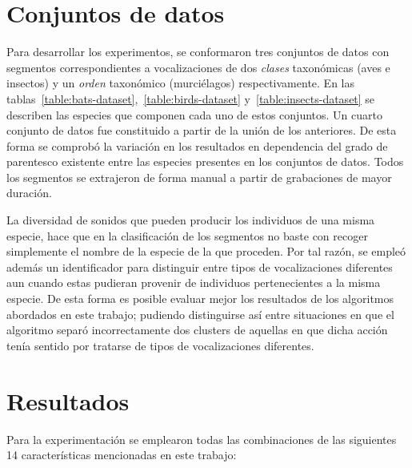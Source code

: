 \section{Conjuntos de datos}\label{sec:datasets}

Para desarrollar los experimentos, se conformaron tres conjuntos de datos con segmentos correspondientes a vocalizaciones de dos \textit{clases} taxonómicas (aves e insectos) y un \textit{orden} taxonómico (murciélagos) respectivamente.
En las tablas~\ref{table:bats-dataset},~\ref{table:birds-dataset} y~\ref{table:insects-dataset} se describen las especies que componen cada uno de estos conjuntos.
Un cuarto conjunto de datos fue constituido a partir de la unión de los anteriores.
De esta forma se comprobó la variación en los resultados en dependencia del grado de parentesco existente entre las especies presentes en los conjuntos de datos.
Todos los segmentos se extrajeron de forma manual a partir de grabaciones de mayor duración.

La diversidad de sonidos que pueden producir los individuos de una misma especie, hace que en la clasificación de los segmentos no baste con recoger simplemente el nombre de la especie de la que proceden.
Por tal razón, se empleó además un identificador para distinguir entre tipos de vocalizaciones diferentes aun cuando estas pudieran provenir de individuos pertenecientes a la misma especie.
De esta forma es posible evaluar mejor los resultados de los algoritmos abordados en este trabajo;
pudiendo distinguirse así entre situaciones en que el algoritmo separó incorrectamente dos clusters de aquellas en que dicha acción tenía sentido por tratarse de tipos de vocalizaciones diferentes.

\section{Resultados}\label{sec:results}

Para la experimentación se emplearon todas las combinaciones de las siguientes 14 características mencionadas en este trabajo:

